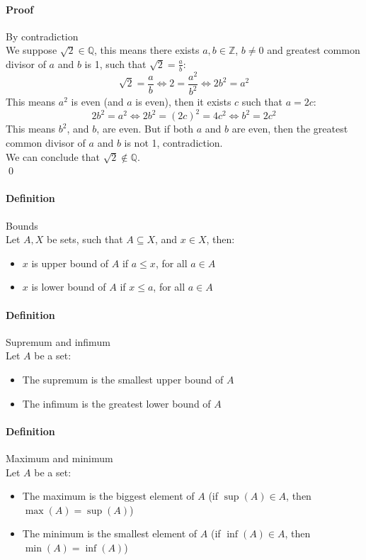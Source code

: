 \documentclass{article}
\newcommand{\Z}{\mathbb{Z}}
\newcommand{\Q}{\mathbb{Q}}
\newcommand{\Def}{\paragraph{Definition}}
\newcommand{\Proof}{\paragraph{Proof}}
\begin{document}
  \Proof By contradiction
\\We suppose $\sqrt{2} \in \Q$, this means there exists $a, b \in \Z$, $b \neq
  0$ and greatest common divisor of $a$ and $b$ is 1, such
  that $\sqrt{2} = \frac{a}{b}$:
  \begin{equation*}
    \sqrt{2} = \frac{a}{b} \iff 2 = \frac{a^2}{b^2} \iff 2b^2 = a^2
  \end{equation*}
  This means $a^2$ is even (and $a$ is even), then it exists $c$ such that $a =
  2c$:
  \begin{equation*}
    2b^2 = a^2 \iff 2b^2 = (2c)^2 = 4c^2 \iff b^2 = 2c^2
  \end{equation*}
  This means $b^2$, and $b$, are even. But if both $a$ and $b$ are even, then
  the greatest common divisor of $a$ and $b$ is not 1, contradiction.
\\We can conclude that $\sqrt{2} \notin \Q$.
\\\qed

  \Def Bounds
\\Let $A, X$ be sets, such that $A \subseteq X$, and $x \in X$, then:
  \begin{itemize}
    \item $x$ is upper bound of $A$ if $a \leq x$, for all $a \in A$
    \item $x$ is lower bound of $A$ if $x \leq a$, for all $a \in A$
  \end{itemize}

  \Def Supremum and infimum
\\Let $A$ be a set:
  \begin{itemize}
    \item The supremum is the smallest upper bound of $A$
    \item The infimum is the greatest lower bound of $A$
  \end{itemize}

  \Def Maximum and minimum
\\Let $A$ be a set:
  \begin{itemize}
    \item The maximum is the biggest element of $A$ (if $\sup(A) \in A$, then
    $\max(A) = \sup(A)$)
    \item The minimum is the smallest element of $A$ (if $\inf(A) \in A$, then
    $\min(A) = \inf(A)$)
  \end{itemize}
\end{document}
